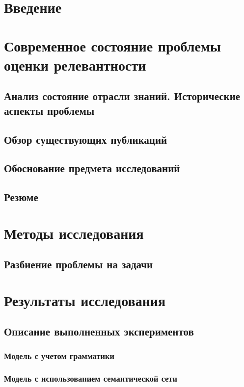 \documentclass[a4paper,14pt,oneside,openany]{memoir}
\begin{document}
\sloppy

\tableofcontents*
\chapter*{Введение}

\chapter{Современное состояние проблемы оценки релевантности}
\section{Анализ состояние отрасли знаний. Исторические аспекты проблемы}

\section{Обзор существующих публикаций}

\section{Обоснование предмета исследований}

\section{Резюме}

\chapter{Методы исследования}

\section{Разбиение проблемы на задачи}

\chapter{Результаты исследования}
\section{Описание выполненных экспериментов}

\subsection{Модель с учетом грамматики}

\subsection{Модель с использованием семантической сети}

\end{document}
